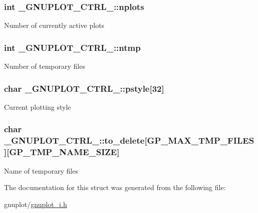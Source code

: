 \subsubsection[{nplots}]{\setlength{\rightskip}{0pt plus 5cm}int \+\_\+\+G\+N\+U\+P\+L\+O\+T\+\_\+\+C\+T\+R\+L\+\_\+\+::nplots}\label{struct__GNUPLOT__CTRL___a5b06b0488db37f772b916098c0abd354}
Number of currently active plots \hypertarget{struct__GNUPLOT__CTRL___a88196f871d2e10a48c16f7539a04b7c1}{}
\subsubsection[{ntmp}]{\setlength{\rightskip}{0pt plus 5cm}int \+\_\+\+G\+N\+U\+P\+L\+O\+T\+\_\+\+C\+T\+R\+L\+\_\+\+::ntmp}\label{struct__GNUPLOT__CTRL___a88196f871d2e10a48c16f7539a04b7c1}
Number of temporary files \hypertarget{struct__GNUPLOT__CTRL___a469437799a4bf7383bdbabac2590a7ba}{}
\subsubsection[{pstyle}]{\setlength{\rightskip}{0pt plus 5cm}char \+\_\+\+G\+N\+U\+P\+L\+O\+T\+\_\+\+C\+T\+R\+L\+\_\+\+::pstyle\mbox{[}32\mbox{]}}\label{struct__GNUPLOT__CTRL___a469437799a4bf7383bdbabac2590a7ba}
Current plotting style \hypertarget{struct__GNUPLOT__CTRL___a97b62dbc77e2491651700c17c8c25551}{}
\subsubsection[{to\+\_\+delete}]{\setlength{\rightskip}{0pt plus 5cm}char \+\_\+\+G\+N\+U\+P\+L\+O\+T\+\_\+\+C\+T\+R\+L\+\_\+\+::to\+\_\+delete\mbox{[}{\bf G\+P\+\_\+\+M\+A\+X\+\_\+\+T\+M\+P\+\_\+\+F\+I\+L\+E\+S}\mbox{]}\mbox{[}{\bf G\+P\+\_\+\+T\+M\+P\+\_\+\+N\+A\+M\+E\+\_\+\+S\+I\+Z\+E}\mbox{]}}\label{struct__GNUPLOT__CTRL___a97b62dbc77e2491651700c17c8c25551}
Name of temporary files 

The documentation for this struct was generated from the following file\+:\begin{DoxyCompactItemize}
\item 
gnuplot/\hyperlink{gnuplot__i_8h}{gnuplot\+\_\+i.\+h}\end{DoxyCompactItemize}
